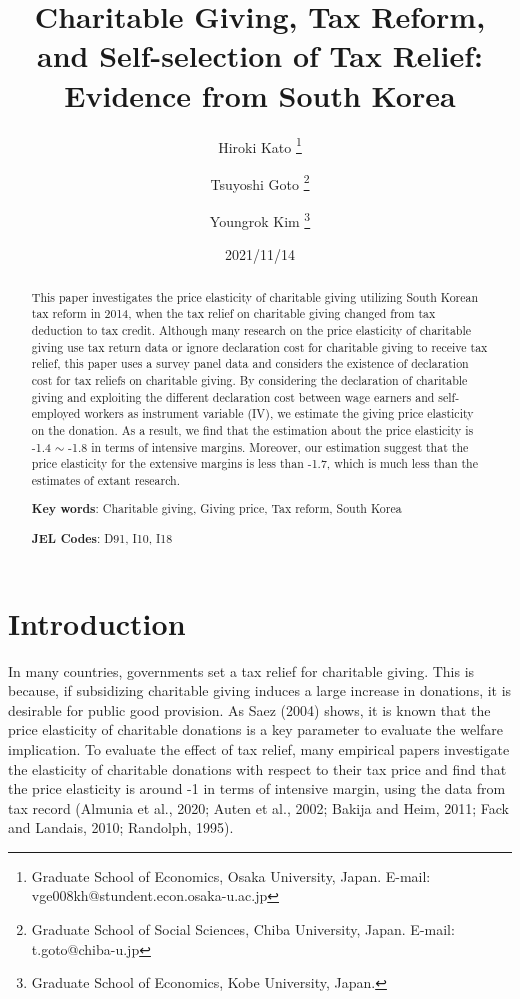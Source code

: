 \documentclass[
  11pt,
  a4paper,
]{article}
\title{Charitable Giving, Tax Reform, and Self-selection of Tax Relief: Evidence from South Korea  }
\author{
    Hiroki Kato
  \thanks{Graduate School of Economics, Osaka University, Japan. E-mail: vge008kh@stundent.econ.osaka-u.ac.jp  }
  \and
    Tsuyoshi Goto
  \thanks{Graduate School of Social Sciences, Chiba University, Japan. E-mail: t.goto@chiba-u.jp  }
  \and
    Youngrok Kim
  \thanks{Graduate School of Economics, Kobe University, Japan.  }
  \and
  }
\date{2021/11/14}
\begin{document}
\begin{spacing}{1}
  \maketitle
\end{spacing}
\begin{spacing}{1}
  \begin{abstract}
    This paper investigates the price elasticity of charitable giving utilizing South Korean tax reform in 2014, when the tax relief on charitable giving changed from tax deduction to tax credit. Although many research on the price elasticity of charitable giving use tax return data or ignore declaration cost for charitable giving to receive tax relief, this paper uses a survey panel data and considers the existence of declaration cost for tax reliefs on charitable giving.
    By considering the declaration of charitable giving and exploiting the different declaration cost between wage earners and self-employed workers as instrument variable (IV), we estimate the giving price elasticity on the donation. As a result, we find that the estimation about the price elasticity is -1.4 \(\sim\) -1.8 in terms of intensive margins.
    Moreover, our estimation suggest that the price elasticity for the extensive margins is less than -1.7, which is much less than the estimates of extant research.
    
            \noindent
    \textbf{Key words}: Charitable giving, Giving price, Tax reform, South Korea
        
        \noindent
    \textbf{JEL Codes}: D91, I10, I18
        
  \end{abstract}
\end{spacing}

\hypertarget{introduction}{%
\section{Introduction}\label{introduction}}

In many countries, governments set a tax relief for charitable giving. This is because, if subsidizing charitable giving induces a large increase in donations, it is desirable for public good provision. As Saez (2004) shows, it is known that the price elasticity of charitable donations is a key parameter to evaluate the welfare implication. To evaluate the effect of tax relief, many empirical papers investigate the elasticity of charitable donations with respect to their tax price and find that the price elasticity is around -1 in terms of intensive margin, using the data from tax record (Almunia et al., 2020; Auten et al., 2002; Bakija and Heim, 2011; Fack and Landais, 2010; Randolph, 1995).
\end{document}
